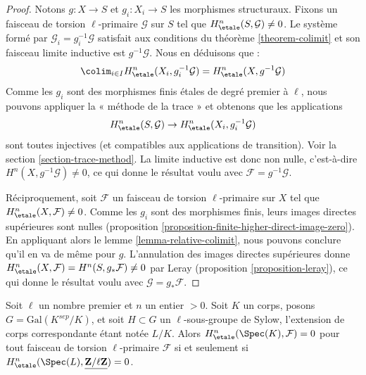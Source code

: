 \begin{proof}
Notons $g : X \to S$ et $g_i : X_i \to S$ les morphismes structuraux.
Fixons un faisceau de torsion $\ell$-primaire $\mathcal{G}$ sur $S$
tel que $H^n_\etale(S, \mathcal{G}) \not = 0$.
Le syst\`eme form\'e par $\mathcal{G}_i = g_i^{-1}\mathcal{G}$
satisfait aux conditions du th\'eor\`eme \ref{theorem-colimit}
et son faisceau limite inductive est $g^{-1}\mathcal{G}$. Nous en
d\'eduisons que :
$$
\colim_{i\in I} H^n_\etale(X_i, g_i^{-1}\mathcal{G}) =
H^n_\etale(X, g^{-1}\mathcal{G})
$$
Comme les $g_i$ sont des morphismes finis \'etales de degr\'e premier
\`a $\ell$, nous pouvons appliquer la « m\'ethode de la trace » et obtenons que
les applications
$$
H^n_\etale(S, \mathcal{G}) \to H^n_\etale(X_i, g_i^{-1}\mathcal{G})
$$
sont toutes injectives (et compatibles aux applications de transition).
Voir la section \ref{section-trace-method}. La limite inductive est donc non nulle, c'est-\`a-dire
$H^n(X,g^{-1}\mathcal{G}) \neq 0$, ce qui donne le r\'esultat voulu avec
$\mathcal{F} = g^{-1}\mathcal{G}$.

\medskip\noindent
R\'eciproquement, soit $\mathcal{F}$ un faisceau de torsion $\ell$-primaire sur $X$
tel que $H^n_\etale(X, \mathcal{F}) \not = 0$. Comme les $g_i$
sont des morphismes finis, leurs images directes sup\'erieures sont nulles
(proposition \ref{proposition-finite-higher-direct-image-zero}).
En appliquant alors le lemme \ref{lemma-relative-colimit},
nous pouvons conclure qu'il en va de m\^eme pour $g$.
L'annulation des images directes sup\'erieures donne
$H^n_\etale(X, \mathcal{F}) = H^n(S, g_*\mathcal{F}) \neq 0$
par Leray (proposition \ref{proposition-leray}),
ce qui donne le r\'esultat voulu avec $\mathcal{G} = g_*\mathcal{F}$.
\end{proof}

\begin{lemma}
\label{lemma-reduce-to-l-group}
Soit $\ell$ un nombre premier et $n$ un entier $> 0$.
Soit $K$ un corps, posons $G = \text{Gal}(K^{sep}/K)$, et soit
$H \subset G$ un $\ell$-sous-groupe de Sylow, l'extension de corps
correspondante \'etant not\'ee $L/K$. Alors
$H^n_\etale(\Spec(K), \mathcal{F}) = 0$ pour tout faisceau
de torsion $\ell$-primaire $\mathcal{F}$ si et seulement si
$H^n_\etale(\Spec(L), \underline{\mathbf{Z}/\ell\mathbf{Z}}) = 0$.
\end{lemma}

